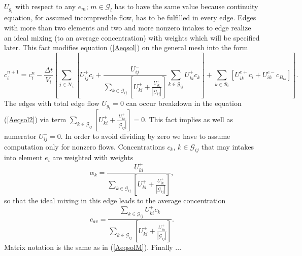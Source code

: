 $U_{g_{l}}$ with respect to any $e_m$; $m \in \mathcal{G}_{l}$ has to have the same value because continuity equation, for assumed incompresible flow, has to
 be fulfilled in every edge. Edges with more than two elements and two and more nonzero intakes to edge realize an ideal mixing (to an average concentration) 
with weights which will be specified later. This fact modifies equation (\ref{Aeqsol}) on the general mesh into the form
    \begin{equation}
      c_i^{n+1} = c_i^n - \frac{\Delta t}{V_{i}} \left[ \sum_{j \in \mathcal{N}_{i}} \left[ U_{ij}^{+} c_i +  \frac{U_{ij}^{-}}{ \sum\limits_{k \in \mathcal{G}_{ij}}
      \left[ U_{ki}^{+} + \frac{U_{ik}^{+}}{|\mathcal{G}_{ij}|} \right] } \sum\limits_{k \in \mathcal{G}_{ij}} U_{ki}^{+} c_{k} \right] + 
      \sum_{k \in \mathcal{B}_{i}}  \left[  U_{ik}^{e+} c_i +  U_{ik}^{e-} c_{B_{ik}} \right] \right]. \label{Aeqsol2}
    \end{equation}
The edges with total edge flow $U_{g_{l}} = 0$ can occur breakdown in the equation (\ref{Aeqsol2}) via term $\sum\limits_{k \in \mathcal{G}_{ij}}\left[ U_{ki}^{+} + \frac{U_{ik}^{+}}{|\mathcal{G}_{ij}|} \right] = 0$.
This fact implies as well as numerator $U_{ij}^{-} = 0$. In order to avoid dividing by zero we have to assume computation only for nonzero flows.
Concentrations $c_k$, $k \in \mathcal{G}_{ij}$ that may intakes into element $e_i$ are weighted with weights 
\begin{equation}
 \alpha_k = \frac{U_{ki}^{+}}{\sum\limits_{k \in \mathcal{G}_{ij}} \left[ U_{ki}^{+} + \frac{U_{ik}^{+}}{|\mathcal{G}_{ij}|} \right] }, \label{weights}
\end{equation}
so that the ideal mixing in this edge leads to the average concentration 
\begin{equation}
 c_{av} = \frac{\sum\limits_{k \in \mathcal{G}_{ij}} U_{ki}^{+} c_{k}}{\sum\limits_{k \in \mathcal{G}_{ij}} \left[ U_{ki}^{+} + \frac{U_{ik}^{+}}{|\mathcal{G}_{ij}|} \right] }. \label{cav}
\end{equation}
Matrix notation is the same as in (\ref{AeqsolM}). Finally ...